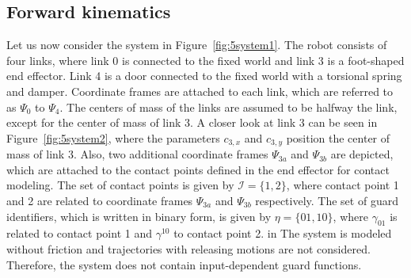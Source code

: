 \documentclass[../DC2019003Bouma.tex]{subfiles}
\begin{document}
\subsection{Forward kinematics}\label{sec:5kin}
Let us now consider the system in Figure~\ref{fig:5system1}. The robot consists of four links, where link 0 is connected to the fixed world and link 3 is a foot-shaped end effector. Link 4 is a door connected to the fixed world with a torsional spring and damper. Coordinate frames are attached to each link, which are referred to as $\Psi_0$ to $\Psi_4$. The centers of mass of the links are assumed to be halfway the link, except for the center of mass of link 3. A closer look at link 3 can be seen in Figure~\ref{fig:5system2}, where the parameters $c_{3,x}$ and $c_{3,y}$ position the center of mass of link 3. Also, two additional coordinate frames $\Psi_{3a}$ and $\Psi_{3b}$ are depicted, which are attached to the contact points defined in the end effector for contact modeling. The set of contact points is given by $\mathcal{I} = \{1,2\}$, where contact point 1 and 2 are related to coordinate frames $\Psi_{3a}$ and $\Psi_{3b}$ respectively. The set of guard identifiers, which is written in binary form, is given by $\eta = \{01,10\}$, where $\gamma_{01}$ is related to contact point 1 and $\gamma^{10}$ to contact point 2. in The system is modeled without friction and trajectories with releasing motions are not considered. Therefore, the system does not contain input-dependent guard functions.
\end{document}
